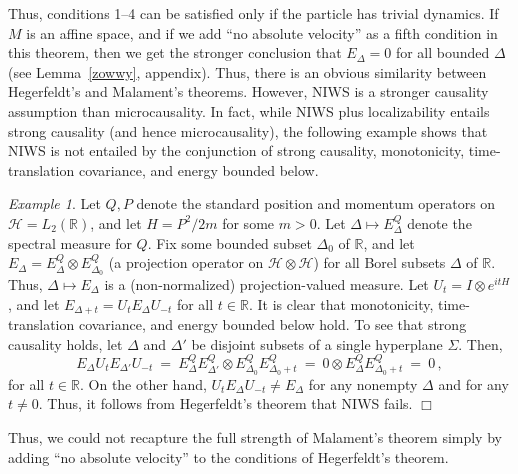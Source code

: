 \documentclass[11pt]{article}
\theoremstyle{remark}
\newtheorem{example}{Example}
\newcommand{\hil}[1]{\mathcal{#1}}
\begin{document}
Thus, conditions 1--4 can be satisfied only if the particle has
trivial dynamics.  If $M$ is an affine space, and if we add ``no
absolute velocity'' as a fifth condition in this theorem, then we get
the stronger conclusion that $E_{\Delta}=0$ for all bounded $\Delta$
(see Lemma~\ref{zowwy}, appendix).  Thus, there is an obvious
similarity between Hegerfeldt's and Malament's theorems.  However,
NIWS is a stronger causality assumption than microcausality.  In fact,
while NIWS plus localizability entails strong causality (and hence
microcausality), the following example shows that NIWS is not entailed
by the conjunction of strong causality, monotonicity, time-translation
covariance, and energy bounded below.
\begin{example} \label{descartes} Let $Q,P$ denote the standard
  position and momentum operators on $\hil{H}=L_{2}(\mathbb{R})$, and
  let $H=P^{2}/2m$ for some $m>0$.  Let $\Delta \mapsto
  E^{Q}_{\Delta}$ denote the spectral measure for $Q$.  Fix some
  bounded subset $\Delta _{0}$ of $\mathbb{R}$, and let
  $E_{\Delta}=E^{Q}_{\Delta}\otimes E^{Q}_{\Delta _{0}}$ (a projection
  operator on $\hil{H}\otimes \hil{H}$) for all Borel subsets $\Delta$
  of $\mathbb{R}$.  Thus, $\Delta \mapsto E_{\Delta}$ is a
  (non-normalized) projection-valued measure.  Let $U_{t}=I\otimes
  e^{itH}$, and let $E_{\Delta +t}=U_{t}E_{\Delta}U_{-t}$ for all
  $t\in \mathbb{R}$.  It is clear that monotonicity, time-translation
  covariance, and energy bounded below hold.  To see that strong
  causality holds, let $\Delta$ and $\Delta '$ be disjoint subsets of
  a single hyperplane $\Sigma$.  Then,
\begin{equation}
E_{\Delta}U_{t}E_{\Delta '}U_{-t}\:=\:E^{Q}_{\Delta}E^{Q}_{\Delta '}\otimes
  E^{Q}_{\Delta _{0}}E^{Q}_{\Delta _{0}+t}\:=\: 
0\otimes E^{Q}_{\Delta}E^{Q}_{\Delta _{0}+t}\:=\: 0 \,,\end{equation}
for all $t\in \mathbb{R}$.  On the other hand, 
  $U_{t}E_{\Delta}U_{-t}\neq E_{\Delta}$ for any nonempty $\Delta$ and
  for any $t\neq 0$.  
Thus, it follows from Hegerfeldt's theorem that NIWS fails.  \hfill $\Box$
\end{example}
Thus, we could not recapture the full strength of Malament's theorem
simply by adding ``no absolute velocity'' to the conditions of
Hegerfeldt's theorem.
\end{document}
